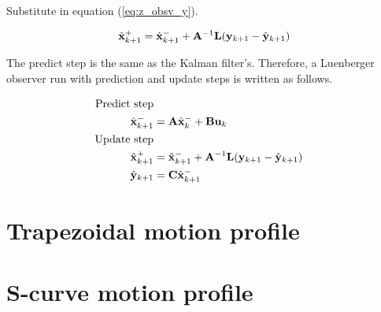 Substitute in equation (\ref{eq:z_obsv_y}).

\begin{equation*}
  \hat{\mathbf{x}}_{k+1}^+ = \hat{\mathbf{x}}_{k+1}^- + \mathbf{A}^{-1}\mathbf{L}
    (\mathbf{y}_{k+1} - \hat{\mathbf{y}}_{k+1})
\end{equation*}

The predict step is the same as the Kalman filter's. Therefore, a Luenberger
\gls{observer} run with prediction and update steps is written as follows.

\begin{align}
  \text{Predict step} \nonumber \\
  \hat{\mathbf{x}}_{k+1}^- &= \mathbf{A}\hat{\mathbf{x}}_k^- + \mathbf{B}\mathbf{u}_k \\
  \text{Update step} \nonumber \\
  \hat{\mathbf{x}}_{k+1}^+ &= \hat{\mathbf{x}}_{k+1}^- + \mathbf{A}^{-1}\mathbf{L}
    (\mathbf{y}_{k+1} - \hat{\mathbf{y}}_{k+1}) \\
  \hat{\mathbf{y}}_{k+1} &= \mathbf{C} \hat{\mathbf{x}}_{k+1}^-
\end{align}

\section{Trapezoidal motion profile}
\label{sec:deriv_trapezoid_profile}

\section{S-curve motion profile}
\label{sec:deriv_s-curve_profile}
